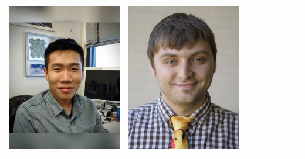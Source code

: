 \documentclass[landscape,a0paper,fontscale=0.292]{baposter}
\begin{document}
\begin{poster}
{\begin{center}
\begin{tabularx}{\linewidth}{X X X X X X X X X}
{\centering \includegraphics[width=0.65\linewidth]{chen.jpg}}&
{\centering \includegraphics[width=0.65\linewidth]{cap.jpg}}&

\end{tabularx}
\end{center}}
\end{poster}
\end{document}
